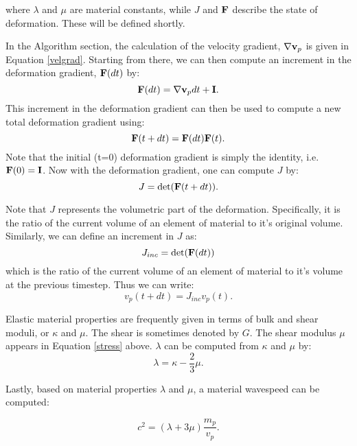 where $\lambda$ and $\mu$ are material constants, while $J$ and 
$\mbox{\ensuremath{\mathbf{F}}}$ describe the state of deformation.  These will be 
defined shortly.

In the Algorithm section, the calculation of the velocity 
gradient, $\nabla \mbox{\ensuremath{\mathbf{v}}}_p$ is given in Equation \ref{velgrad}.
Starting from there, we can then compute an increment in the 
deformation gradient, $\mbox{\ensuremath{\mathbf{F}}}(dt)$ by:
\begin{equation}
	\mbox{\ensuremath{\mathbf{F}}}(dt) = \nabla \mbox{\ensuremath{\mathbf{v}}}_p dt + \mbox{\ensuremath{\mathbf{I}}}.
\end{equation}
This increment in the deformation gradient can then be used to 
compute a new total deformation gradient using:
\begin{equation}
	\mbox{\ensuremath{\mathbf{F}}}(t+dt) = \mbox{\ensuremath{\mathbf{F}}}(dt) \mbox{\ensuremath{\mathbf{F}}}(t).
\end{equation}
Note that the initial (t=0) deformation gradient is simply the 
identity, i.e. $\mbox{\ensuremath{\mathbf{F}}}(0) = \mbox{\ensuremath{\mathbf{I}}}$.  Now with the deformation 
gradient, one can compute $J$ by:
\begin{equation}
	J = \det(\mbox{\ensuremath{\mathbf{F}}}(t+dt)).
\end{equation}

Note that $J$ represents the volumetric part of the deformation.  
Specifically, it is the ratio of the current volume of an 
element of material to it's original volume.  Similarly, we can
define an increment in $J$ as:
\begin{equation}
	J_{inc} = \det(\mbox{\ensuremath{\mathbf{F}}}(dt))
\end{equation}
which  is the ratio of the current volume of an element of 
material to it's volume at the previous timestep.  Thus we can 
write:
\begin{equation}
	v_p(t+dt) = J_{inc} v_p(t).
\end{equation}

Elastic material properties are frequently given in terms of 
bulk and shear moduli, or $\kappa$ and $\mu$.  The shear is 
sometimes denoted by $G$.  The shear modulus $\mu$ appears in 
Equation \ref{stress} above.  $\lambda$ can be computed from
$\kappa$ and $\mu$ by:
\begin{equation}
	\lambda = \kappa - \frac{2}{3}\mu.
\end{equation}

Lastly, based on material properties $\lambda$ and $\mu$, a material 
wavespeed can be computed:

\begin{equation}
	c^2 = (\lambda + 3 \mu)\frac{m_p}{v_p}.
\end{equation}

